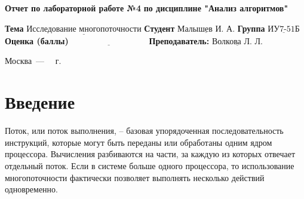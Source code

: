 \documentclass[12pt]{report}
\begin{document}
\begin{titlepage}
	
	\begin{center}
		\noindent\begin{minipage}{1.3\textwidth}\centering
			\Large\textbf{  Отчет по лабораторной работе №4}\newline
			\textbf{по дисциплине "Анализ алгоритмов"}\newline\newline
		\end{minipage}
	\end{center}
	
	\noindent\textbf{Тема} $\underline{\text{Исследование многопоточности}}$\newline\newline
	\noindent\textbf{Студент} $\underline{\text{Малышев И. А.}}$\newline\newline
	\noindent\textbf{Группа} $\underline{\text{ИУ7-51Б}}$\newline\newline
	\noindent\textbf{Оценка (баллы)} $\underline{\text{~~~~~~~~~~~~~~~~~~~~~~~~~~~}}$\newline\newline
	\noindent\textbf{Преподаватель: } $\underline{\text{Волкова Л. Л.}}$\newline\newline\newline
	
	\begin{center}
		\vfill
		Москва~---~\the\year
		~г.
	\end{center}
\end{titlepage}


\renewcommand{\contentsname}{Содержание}
\tableofcontents
  
\newpage
\chapter*{Введение}

Поток, или поток выполнения, -- базовая упорядоченная последовательность инструкций, которые могут быть переданы или обработаны одним ядром процессора. Вычисления разбиваются на части, за каждую из которых отвечает отдельный поток. Если в системе больше одного процессора, то использование многопоточности фактически позволяет выполнять несколько действий одновременно.
\end{document}
